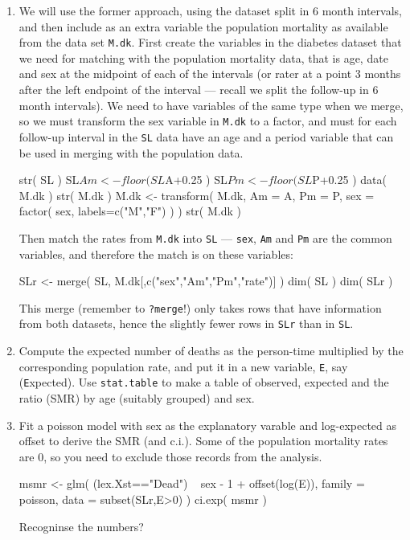 \begin{enumerate}[resume]
\item We will use the former approach, using the dataset split in
  6 month intervals, and then include as an extra variable the
  population mortality as available from the data set
  \texttt{M.dk}.
  First create the variables in the diabetes dataset that we need
  for matching with the population mortality data, that is age, date
  and sex at the midpoint of each of the intervals (or rater at a
  point 3 months after the left endpoint of the interval --- recall
  we split the follow-up in 6 month intervals).
  We need to have variables of the same type when we merge, so we must
  transform the sex variable in \texttt{M.dk} to a factor, and must
  for each follow-up interval in the \texttt{SL} data have an age and
  a period variable that can be used in merging with the population data. 
\begin{Schunk}
\begin{Sinput}
 str( SL )
 SL$Am <- floor( SL$A+0.25 )
 SL$Pm <- floor( SL$P+0.25 )
 data( M.dk )
 str( M.dk )
 M.dk <- transform( M.dk, Am = A,
                          Pm = P,
                         sex = factor( sex, labels=c("M","F") ) )
 str( M.dk )
\end{Sinput}
\end{Schunk}
Then match the rates from \texttt{M.dk} into \texttt{SL} ---
\texttt{sex}, \texttt{Am} and \texttt{Pm} are the common variables,
and therefore the match is on these variables:
\begin{Schunk}
\begin{Sinput}
 SLr <- merge( SL, M.dk[,c("sex","Am","Pm","rate")] )
 dim( SL )
 dim( SLr )
\end{Sinput}
\end{Schunk}
This merge (remember to \texttt{?merge}!) only takes rows that have
information from both datasets, hence the slightly fewer rows in
\texttt{SLr} than in \texttt{SL}.
\item Compute the expected number of deaths as the person-time
   multiplied by the corresponding population rate, and put it in a
   new variable, \texttt{E}, say (\texttt{E}xpected). Use \texttt{stat.table}
   to make a table of observed, expected and the ratio (SMR) by age
   (suitably grouped) and sex. 
\item Fit a poisson model with sex as the explanatory varable and
  log-expected as offset to derive the SMR (and c.i.).
  Some of the population mortality rates are 0, so you need to exclude
  those records from the analysis.
\begin{Schunk}
\begin{Sinput}
 msmr <- glm( (lex.Xst=="Dead") ~ sex - 1 + offset(log(E)),
              family = poisson,
              data = subset(SLr,E>0) )
 ci.exp( msmr )
\end{Sinput}
\end{Schunk}
  Recogninse the numbers?
\end{enumerate}
